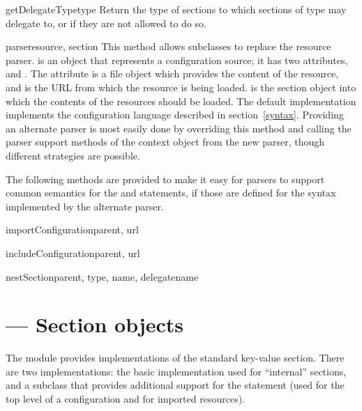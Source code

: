 \documentclass{howto}
\begin{document}
\begin{methoddesc}{getDelegateType}{type}
  Return the type of sections to which sections of type  may
  delegate to, or  if they are not allowed to do so.
\end{methoddesc}

\begin{methoddesc}{parse}{resource, section}
  This method allows subclasses to replace the resource parser.
   is an object that represents a configuration source;
  it has two attributes,  and .  The
   attribute is a file object which provides the content
  of the resource, and  is the URL from which the resource
  is being loaded.   is the section object into which the
  contents of the resources should be loaded.  The default
  implementation implements the configuration language described in
  section~\ref{syntax}.  Providing an
  alternate parser is most easily done by overriding this method and
  calling the parser support methods of the context object from the
  new parser, though different strategies are possible.
\end{methoddesc}

The following methods are provided to make it easy for parsers to
support common semantics for the  and
 statements, if those are defined for the syntax
implemented by the alternate parser.

\begin{methoddesc}{importConfiguration}{parent, url}
\end{methoddesc}

\begin{methoddesc}{includeConfiguration}{parent, url}
\end{methoddesc}

\begin{methoddesc}{nestSection}{parent, type, name, delegatename}
\end{methoddesc}


\section{ --- Section objects}



The  module provides implementations of the
standard key-value section.  There are two implementations: the basic
implementation used for ``internal'' sections, and a subclass that
provides additional support for the  statement (used
for the top level of a configuration and for imported resources).
\end{document}

